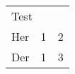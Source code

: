 \begin{table}[]
\begin{tabular}{lll}
\multicolumn{3}{l}{Test} \\
Her      & 1     & 2     \\
Der      & 1     & 3    
\end{tabular}
\end{table}